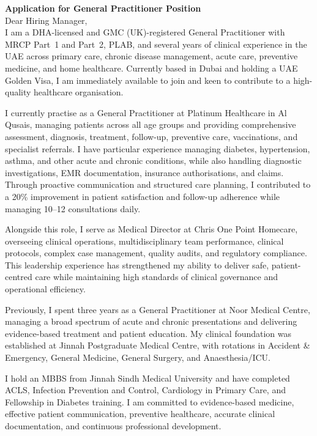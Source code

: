 \documentclass[a4paper,11pt]{article}
\begin{document}
\thispagestyle{empty}

\textbf{Application for General Practitioner Position}\\[0.5em]

Dear Hiring Manager,\\[0.2em]

I am a DHA-licensed and GMC (UK)-registered General Practitioner with MRCP Part~1 and Part~2, PLAB, and several years of clinical experience in the UAE across primary care, chronic disease management, acute care, preventive medicine, and home healthcare. Currently based in Dubai and holding a UAE Golden Visa, I am immediately available to join and keen to contribute to a high-quality healthcare organisation.

I currently practise as a General Practitioner at Platinum Healthcare in Al Qusais, managing patients across all age groups and providing comprehensive assessment, diagnosis, treatment, follow-up, preventive care, vaccinations, and specialist referrals. I have particular experience managing diabetes, hypertension, asthma, and other acute and chronic conditions, while also handling diagnostic investigations, EMR documentation, insurance authorisations, and claims. Through proactive communication and structured care planning, I contributed to a 20\% improvement in patient satisfaction and follow-up adherence while managing 10--12 consultations daily.

Alongside this role, I serve as Medical Director at Chris One Point Homecare, overseeing clinical operations, multidisciplinary team performance, clinical protocols, complex case management, quality audits, and regulatory compliance. This leadership experience has strengthened my ability to deliver safe, patient-centred care while maintaining high standards of clinical governance and operational efficiency.

Previously, I spent three years as a General Practitioner at Noor Medical Centre, managing a broad spectrum of acute and chronic presentations and delivering evidence-based treatment and patient education. My clinical foundation was established at Jinnah Postgraduate Medical Centre, with rotations in Accident \& Emergency, General Medicine, General Surgery, and Anaesthesia/ICU.

I hold an MBBS from Jinnah Sindh Medical University and have completed ACLS, Infection Prevention and Control, Cardiology in Primary Care, and Fellowship in Diabetes training. I am committed to evidence-based medicine, effective patient communication, preventive healthcare, accurate clinical documentation, and continuous professional development.
\end{document}
